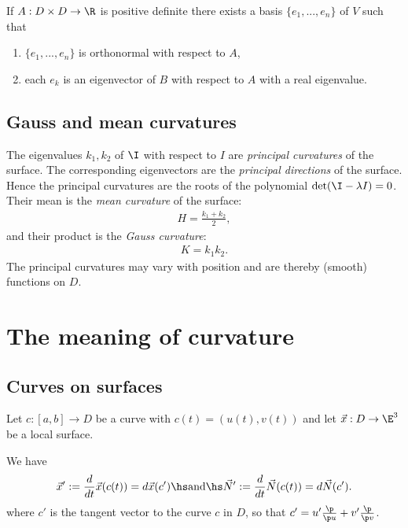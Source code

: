 \documentclass{article}
\begin{document}
\begin{proposition}
    If $A:D\times D\to\R$ is positive definite there exists a basis $\{e_1, ..., e_n\}$ of $V$ such that
    \begin{enumerate}
        \item $\{e_1,...,e_n\}$ is orthonormal with respect to $A$,
        \item each $e_k$ is an eigenvector of $B$ with respect to $A$ with a real eigenvalue.
    \end{enumerate}
\end{proposition}

\subsection{Gauss and mean curvatures}

\begin{definition}
    The eigenvalues $k_1,k_2$ of $\I$ with respect to $I$ are \emph{principal curvatures} of the surface.
    The corresponding eigenvectors are the \emph{principal directions} of the surface. Hence the
    principal curvatures are the roots of the polynomial $\det(\I-\lambda I)=0$. Their mean is the
    \emph{mean curvature} of the surface:
    \begin{align*}
        H=\frac{k_1+k_2}{2},
    \end{align*}
    and their product is the \emph{Gauss curvature}:
    \begin{align*}
        K = k_1k_2.
    \end{align*}
    The principal curvatures may vary with position and are thereby (smooth) functions on $D$.
\end{definition}

\section{The meaning of curvature}

\subsection{Curves on surfaces}

Let $c:[a,b]\to D$ be a curve with $c(t)=(u(t),v(t))$ and let $\vec x: D\to\E^3$ be a 
local surface.

\begin{lemma}
    We have 
    \begin{align*}
        \vec x' := \frac{d}{dt}\vec x(c(t)) = d\vec x(c')\hs\text{and}\hs 
        \vec N' := \frac{d}{dt}\vec N(c(t)) = d\vec N(c').
    \end{align*}
    where $c'$ is the tangent vector to the curve $c$ in $D$, so that 
    $c'=u'\frac{\p }{\p u}+v'\frac{\p }{\p v}$.
\end{lemma}
\end{document}
